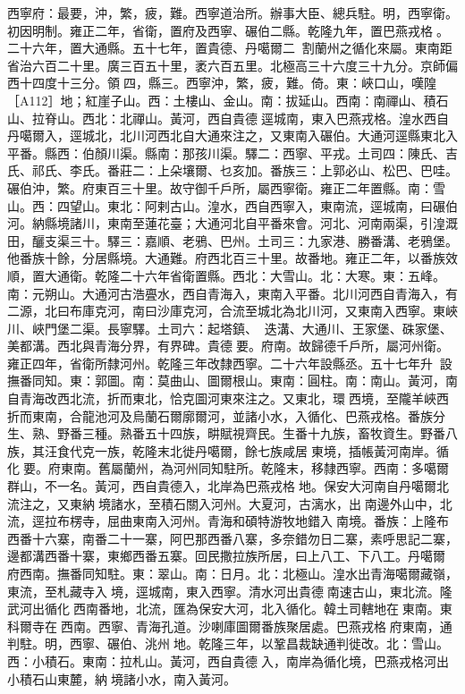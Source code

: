 \begin{pinyinscope}
西寧府：最要，沖，繁，疲，難。西寧道治所。辦事大臣、總兵駐。明，西寧衛。初因明制。雍正二年，省衛，置府及西寧、碾伯二縣。乾隆九年，置巴燕戎格。二十六年，置大通縣。五十七年，置貴德、丹噶爾二，割蘭州之循化來屬。東南距省治六百二十里。廣三百五十里，袤六百五里。北極高三十六度三十九分。京師偏西十四度十三分。領四，縣三。西寧沖，繁，疲，難。倚。東：峽口山，嘆隍［A112］地；紅崖子山。西：土樓山、金山。南：拔延山。西南：南禪山、積石山、拉脊山。西北：北禪山。黃河，西自貴德逕城南，東入巴燕戎格。湟水西自丹噶爾入，逕城北，北川河西北自大通來注之，又東南入碾伯。大通河逕縣東北入平番。縣西：伯顏川渠。縣南：那孩川渠。驛二：西寧、平戎。土司四：陳氏、吉氏、祁氏、李氏。番莊二：上朵壤爾、乜亥加。番族三：上郭必山、松巴、巴哇。碾伯沖，繁。府東百三十里。故守御千戶所，屬西寧衛。雍正二年置縣。南：雪山。西：四望山。東北：阿剌古山。湟水，西自西寧入，東南流，逕城南，曰碾伯河。納縣境諸川，東南至蓮花臺；大通河北自平番來會。河北、河南兩渠，引湟溉田，釃支渠三十。驛三：嘉順、老鴉、巴州。土司三：九家港、勝番溝、老鴉堡。他番族十餘，分居縣境。大通難。府西北百三十里。故番地。雍正二年，以番族效順，置大通衛。乾隆二十六年省衛置縣。西北：大雪山。北：大寒。東：五峰。南：元朔山。大通河古浩亹水，西自青海入，東南入平番。北川河西自青海入，有二源，北曰布庫克河，南曰沙庫克河，合流至城北為北川河，又東南入西寧。東峽川、峽門堡二渠。長寧驛。土司六：起塔鎮、迭溝、大通川、王家堡、硃家堡、美都溝。西北與青海分界，有界碑。貴德要。府南。故歸德千戶所，屬河州衛。雍正四年，省衛所隸河州。乾隆三年改隸西寧。二十六年設縣丞。五十七年升，設撫番同知。東：郭圖。南：莫曲山、圖爾根山。東南：圓柱。南：南山。黃河，南自青海改西北流，折而東北，恰克圖河東來注之。又東北，環西境，至隴羊峽西折而東南，合龍池河及烏蘭石爾廓爾河，並諸小水，入循化、巴燕戎格。番族分生、熟、野番三種。熟番五十四族，畊賦視齊民。生番十九族，畜牧資生。野番八族，其汪食代克一族，乾隆末北徙丹噶爾，餘七族咸居東境，插帳黃河南岸。循化要。府東南。舊屬蘭州，為河州同知駐所。乾隆末，移隸西寧。西南：多噶爾群山，不一名。黃河，西自貴德入，北岸為巴燕戎格地。保安大河南自丹噶爾北流注之，又東納境諸水，至積石關入河州。大夏河，古漓水，出南邊外山中，北流，逕拉布楞寺，屈曲東南入河州。青海和碩特游牧地錯入南境。番族：上隆布西番十六寨，南番二十一寨，阿巴那西番八寨，多奈錯勿日二寨，素呼思記二寨，邊都溝西番十寨，東鄉西番五寨。回民撒拉族所居，曰上八工、下八工。丹噶爾府西南。撫番同知駐。東：翠山。南：日月。北：北極山。湟水出青海噶爾藏嶺，東流，至札藏寺入境，逕城南，東入西寧。清水河出貴德南速古山，東北流。隆武河出循化西南番地，北流，匯為保安大河，北入循化。韓土司轄地在東南。東科爾寺在西南。西寧、青海孔道。沙喇庫圖爾番族聚居處。巴燕戎格府東南，通判駐。明，西寧、碾伯、洮州地。乾隆三年，以鞏昌裁缺通判徙改。北：雪山。西：小積石。東南：拉札山。黃河，西自貴德入，南岸為循化境，巴燕戎格河出小積石山東麓，納境諸小水，南入黃河。


\end{pinyinscope}
